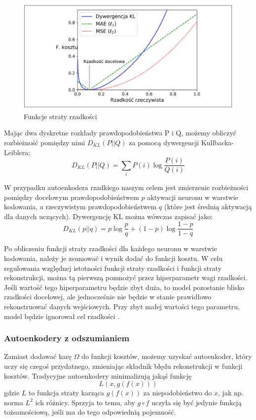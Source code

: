 \documentclass[12pt]{mwbk}
\theoremstyle{plain}
\theoremstyle{definition}
\theoremstyle{remark}
\newcommand\zrodlo[1]{\par\vspace{-3mm}{\small\textit{Źródło: }#1 }}
\begin{document}
\begin{figure}[!h]
	\centering
	\includegraphics[width=\linewidth]{rys/funkcja_straty_rzadkosci.png}
	\caption{Funkcje straty rzadkości}
	\zrodlo{\cite{geron}}
	\label{fig:funkcja-straty-rzadkosci}
\end{figure}

Mając dwa dyskretne rozkłady prawdopodobieństwa P i Q, możemy obliczyć rozbieżność pomiędzy nimi $D_{KL}(P||Q)$ za pomocą dywergencji Kullbacka-Leiblera:
$$D_{KL}(P||Q)=\sum_i P(i)\log \frac{P(i)}{Q(i)}$$

W przypadku autoenkodera rzadkiego naszym celem jest zmierzenie rozbieżności pomiędzy docelowym prawdopodobieństwem $p$ aktywacji neuronu w warstwie kodowania, a rzeczywistym prawdopodobieństwem $q$ (które jest średnią aktywacją dla danych uczących). Dywergencję KL można wówczas zapisać jako:
$$D_{KL}(p||q)=p\log \frac{p}{q}+(1-p)\log \frac{1-p}{1-q}$$

Po obliczeniu funkcji straty rzadkości dla każdego neuronu w warstwie kodowania, należy je zsumować i wynik dodać do funkcji kosztu. W celu regulowania względnej istotności funkcji straty rzadkości i funkcji straty rekonstrukcji, można tą pierwszą pomnożyć przez hiperparametr wagi rzadkości. Jeśli wartość tego hiperparametru będzie zbyt duża, to model pozostanie blisko rzadkości docelowej, ale jednocześnie nie będzie w stanie prawidłowo rekonstruować danych wejściowych. Przy zbyt małej wartości tego parametru, model będzie ignorował cel rzadkości \cite{geron}.




\subsubsection{Autoenkodery z odszumianiem}
Zamiast dodawać karę $\Omega$ do funkcji kosztów, możemy uzyskać autoenkoder, który uczy się czegoś przydatnego, zmieniając składnik błędu rekonstrukcji w funkcji kosztów. Tradycyjne autoenkodery minimalizują jakąś funkcję
$$L(x, g(f(x)))$$
gdzie $L$ to funkcja straty karząca $g(f(x))$ za niepodobieństwo do $x$, jak np. norma $L^2$ ich różnicy. Sprzyja to temu, aby $g \circ f$  uczyła się być jedynie funkcją tożsamościową, jeśli ma do tego odpowiednią pojemność.
\end{document}

